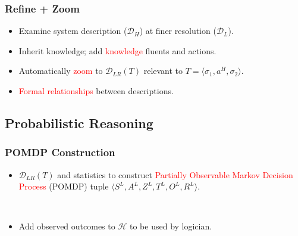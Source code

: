 \documentclass[xcolor=dvipsnames]{beamer}
\begin{document}
\begin{frame} \frametitle{Refine + Zoom} 
  \begin{itemize}
  \item Examine system description ($\mathcal{D}_H$) at finer
    resolution ($\mathcal{D}_L$).

  \item Inherit knowledge; add \textcolor{red}{knowledge} fluents and
    actions.


  \item Automatically \textcolor{red}{zoom} to $\mathcal{D}_{LR}(T)$
    relevant to $T=\langle \sigma_1, a^H, \sigma_2\rangle$.

  \item \textcolor{red}{Formal relationships} between descriptions.
  \end{itemize}


\end{frame}



\subsection{Probabilistic Reasoning}

\begin{frame} \frametitle{POMDP Construction}


  \begin{itemize}
  \item $\mathcal{D}_{LR}(T)$ and statistics to construct
    \textcolor{red}{Partially Observable Markov Decision Process}
    (POMDP) tuple $\langle S^L, A^L, Z^L, T^L, O^L, R^L \rangle$.



    
    \ \\
  \item Add observed outcomes to $\mathcal{H}$ to be used by logician.
  \end{itemize}
\end{frame}
\end{document}
